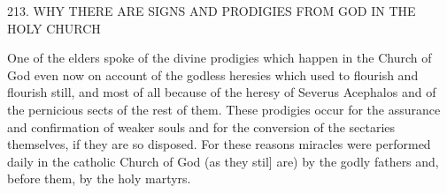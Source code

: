 213.
WHY THERE ARE SIGNS AND PRODIGIES
FROM GOD IN THE HOLY CHURCH

One of the elders spoke of the divine prodigies which happen in the
Church of God even now on account of the godless heresies which
used to flourish and flourish still, and most of all because of the
heresy of Severus Acephalos and of the pernicious sects of the rest
of them.
These prodigies occur for the assurance and confirmation
of weaker souls and for the conversion of the sectaries themselves,
if they are so disposed.
For these reasons miracles were performed
daily in the catholic Church of God (as they stil] are) by the godly
fathers and, before them, by the holy martyrs.

